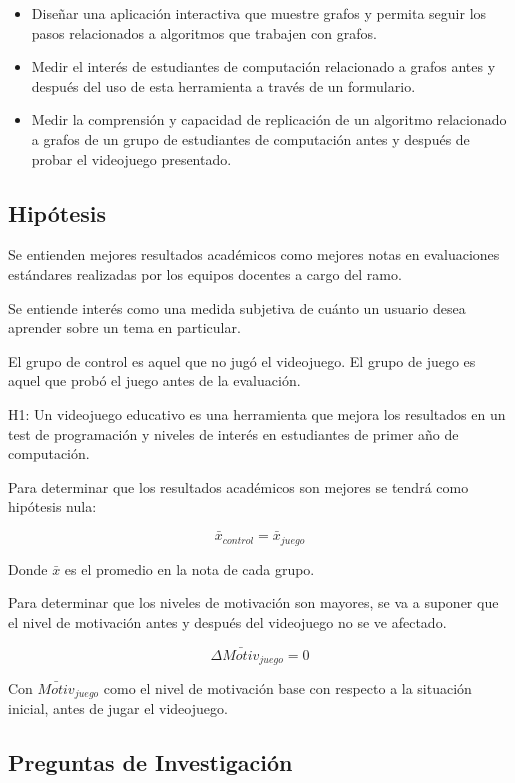 \documentclass[submission]{eptcs}
\begin{document}
\begin{itemize}

\item Diseñar una aplicación interactiva que muestre grafos y permita seguir
los pasos relacionados a algoritmos que trabajen con grafos.

\item Medir el interés de estudiantes de computación relacionado a grafos
antes y después del uso de esta herramienta a través de un formulario.

\item Medir la comprensión y capacidad de replicación de un algoritmo relacionado a grafos
de un grupo de estudiantes de computación antes y después de probar el videojuego presentado.

\end{itemize}


\subsection{Hipótesis}

Se entienden mejores resultados académicos como mejores notas en evaluaciones estándares
realizadas por los equipos docentes a cargo del ramo.

Se entiende interés como una medida subjetiva de cuánto un usuario desea
aprender sobre un tema en particular.

El grupo de control es aquel que no jugó el videojuego.
El grupo de juego es aquel que probó el juego antes de la evaluación. 


H1: Un videojuego educativo es una herramienta que mejora los resultados en un test de programación 
y niveles de interés en estudiantes de primer año de computación.

Para determinar que los resultados académicos son mejores se tendrá como hipótesis nula:

$$ \bar{x}_{control} = \bar{x}_{juego} $$

Donde $\bar{x}$ es el promedio en la nota de cada grupo.

Para determinar que los niveles de motivación son mayores, se va a suponer que el nivel
de motivación antes y después del videojuego no se ve afectado.

$$ \Delta \bar{Motiv}_{juego} = 0 $$

Con $\bar{Motiv}_{juego}$ como el nivel de motivación base con respecto a la situación inicial, antes de jugar
el videojuego.

\subsection{Preguntas de Investigación}
\end{document}

